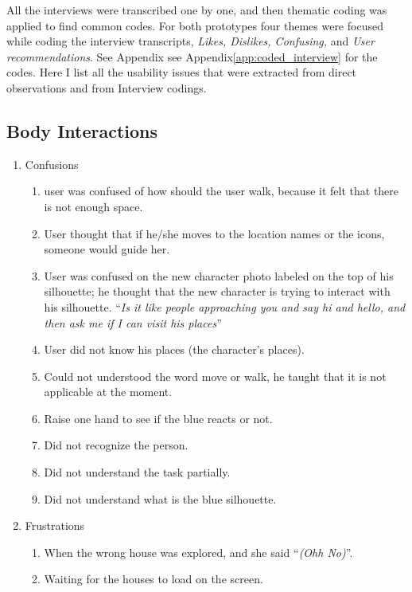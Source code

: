 All the interviews were transcribed one by one, and then thematic coding was applied to find common codes. For both prototypes four themes were focused while coding the interview transcripts, \emph{Likes, Dislikes, Confusing,} and \emph{User recommendations}. See Appendix see Appendix\ref{app:coded_interview} for the codes. Here I list all the usability issues that were extracted from direct observations and from Interview codings.


\subsection{Body Interactions}

\begin{enumerate}
\item Confusions 

\begin{enumerate}
\item  user was confused of how should the user walk, because it felt that there is not enough space. 
\item  User thought that if he/she moves to the location names or the icons, someone would guide her.
\item  User was confused on the new character photo labeled on the top of his silhouette; he thought that the new character is trying to interact with his silhouette. ``\emph{Is it like people approaching you and say hi and hello, and then ask me if I can visit his places}''
\item  User did not know his places (the character’s places).
\item  Could not understood the word move or walk, he taught that it is not applicable at the moment.
\item  Raise one hand to see if the blue reacts or not.
\item  Did not recognize the person.
\item  Did not understand the task partially.
\item  Did not understand what is the blue silhouette.

\end{enumerate}

\item Frustrations
\begin{enumerate}
\item  When the wrong house was explored, and she said ``\emph{(Ohh No)}''.
\item  Waiting for the houses to load on the screen.
\end{enumerate}


\end{enumerate}
